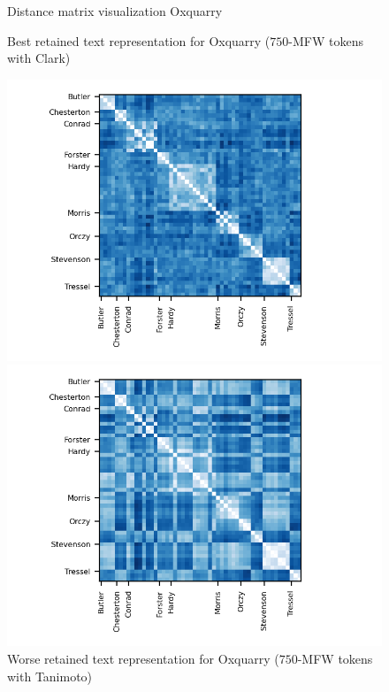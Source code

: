 \begin{figure}
  \caption{Distance matrix visualization Oxquarry}
  \label{fig:distances_matrix_oxquarry}

  \caption{Best retained text representation for Oxquarry ($750$-MFW tokens with Clark)}
  \label{fig:distance_matrix_oxquarry_clark}
  \includegraphics{img/distance_matrix_oxquarry_clark.png}

  \caption{Worse retained text representation for Oxquarry ($750$-MFW tokens with Tanimoto)}
  \label{fig:distance_matrix_oxquarry_tanimoto}
  \includegraphics{img/distance_matrix_oxquarry_tanimoto.png}
\end{figure}
